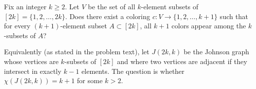 Fix an integer $k\ge 2$.
Let $V$ be the set of all $k$-element subsets of $[2k]=\{1,2,\dots,2k\}$.
Does there exist a coloring $c:V\to\{1,2,\dots,k+1\}$ such that for every $(k+1)$-element subset $A\subset[2k]$, all $k+1$ colors appear among the $k$-subsets of $A$?

Equivalently (as stated in the problem text), let $J(2k,k)$ be the Johnson graph whose vertices are $k$-subsets of $[2k]$ and where two vertices are adjacent if they intersect in exactly $k-1$ elements.
The question is whether $\chi(J(2k,k))=k+1$ for some $k>2$.
